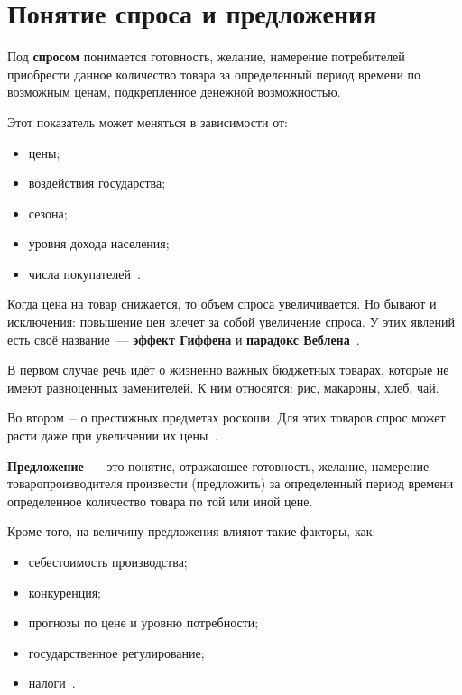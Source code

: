 \chapter{Понятие спроса и предложения}

Под \textbf{спросом} понимается готовность, желание, намерение потребителей приобрести данное количество товара за определенный период времени по возможным ценам, подкрепленное денежной возможностью. 

Этот показатель может меняться в зависимости от:
\begin{itemize}
	\item цены;
	\item воздействия государства;
	\item сезона;
	\item уровня дохода населения;
	\item числа покупателей~\cite{law1}.
\end{itemize}

Когда цена на товар снижается, то объем спроса увеличивается. 
Но бывают и исключения: повышение цен влечет за собой увеличение спроса. 
У этих явлений есть своё название~--- \textbf{эффект Гиффена} и \textbf{парадокс Веблена}~\cite{law1}.
 
В первом случае речь идёт о жизненно важных бюджетных товарах, которые не имеют равноценных заменителей.
К ним относятся: рис, макароны, хлеб, чай.

Во втором~-- о престижных предметах роскоши. 
Для этих товаров спрос может расти даже при увеличении их цены~\cite{law2}. 

\textbf{Предложение}~--- это понятие, отражающее готовность, желание, намерение товаропроизводителя произвести (предложить) за определенный период времени определенное количество товара по той или иной цене.

Кроме того, на величину предложения влияют такие факторы, как:
\begin{itemize}
	\item себестоимость производства;
	\item конкуренция;
	\item прогнозы по цене и уровню потребности;
	\item государственное регулирование;
	\item налоги~\cite{law1}.
\end{itemize}


